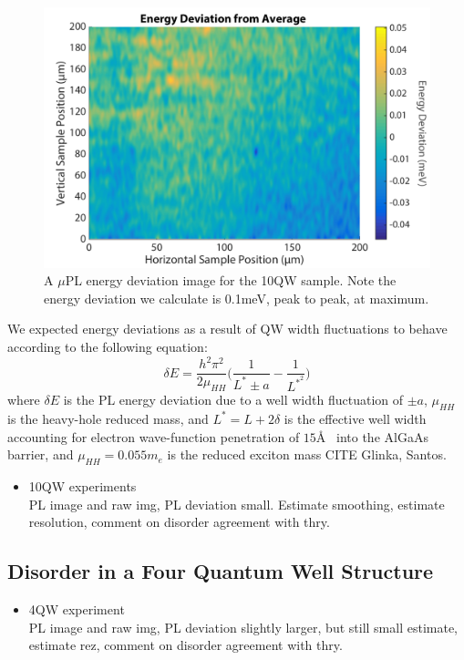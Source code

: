 \begin{figure}[h!]
\centering
\includegraphics[width = .8\textwidth]{10QW_devplot.png}
\caption{ \doublespacing A $\mu$PL energy deviation image for the 10QW sample. Note the energy deviation we calculate is 0.1meV, peak to peak, at maximum.}
\label{devmap10QW}
\end{figure}

\newpage
\indent We expected energy deviations as a result of QW width fluctuations to behave according to the following equation:
\begin{equation}
\delta E = \frac{h^2 \pi^2}{2 \mu_{HH}}\Big ( \frac{1}{L^* \pm a}- \frac{1}{L^{*^2}} \Big )
\end{equation}
where $\delta E$ is the PL energy deviation due to a well width fluctuation of $\pm a$, $\mu_{HH}$ is the heavy-hole reduced mass, and $L^* = L+2\delta$ is the effective well width accounting for electron wave-function penetration of $15$\AA ~ into the AlGaAs barrier, and $\mu_{HH} = 0.055m_e$ is the reduced exciton mass CITE Glinka, Santos. 
\begin{itemize}
\item 10QW experiments\\
\* PL image and raw img, PL deviation small. Estimate smoothing, estimate resolution, comment on disorder agreement with thry.
\end{itemize}
\subsection{Disorder in a Four Quantum Well Structure}
\begin{itemize}
\item 4QW experiment\\
\* PL image and raw img, PL deviation slightly larger, but still small estimate, estimate rez, comment on disorder agreement with thry.
\end{itemize}
